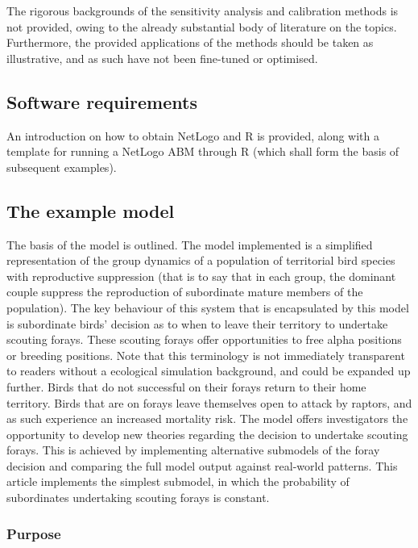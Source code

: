 The rigorous backgrounds of the sensitivity analysis and calibration methods is not provided, owing to the already substantial body of literature on the topics.
Furthermore, the provided applications of the methods should be taken as illustrative, and as such have not been fine-tuned or optimised.

\subsection{Software requirements}
\label{thiele:intro:software}

An introduction on how to obtain NetLogo and R is provided, along with a template for running a NetLogo ABM through R (which shall form the basis of subsequent examples).

\subsection{The example model}
\label{thiele:intro:example}

The basis of the model is outlined.
The model implemented is a simplified representation of the group dynamics of a population of territorial bird species with reproductive suppression (that is to say that in each group, the dominant couple suppress the reproduction of subordinate mature members of the population).
The key behaviour of this system that is encapsulated by this model is subordinate birds' decision as to when to leave their territory to undertake scouting forays.
These scouting forays offer opportunities to free alpha positions or breeding positions.
Note that this terminology is not immediately transparent to readers without a ecological simulation background, and could be expanded up further.
Birds that do not successful on their forays return to their home territory.
Birds that are on forays leave themselves open to attack by raptors, and as such experience an increased mortality risk.
The model offers investigators the opportunity to develop new theories regarding the decision to undertake scouting forays.
This is achieved by implementing alternative submodels of the foray decision and comparing the full model output against real-world patterns.
This article implements the simplest submodel, in which the probability of subordinates undertaking scouting forays is constant.

\subsubsection{Purpose}
\label{thiele:intro:example:purpose}

